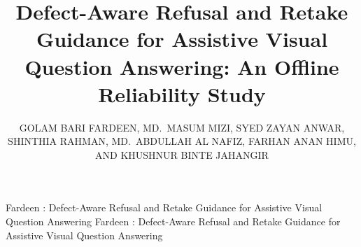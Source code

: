 \documentclass{ieeeaccess}
\begin{document}

\title{Defect-Aware Refusal and Retake Guidance for Assistive Visual Question Answering: An Offline Reliability Study}

\author{\uppercase{Golam Bari Fardeen, Md.\ Masum Mizi, Syed Zayan
Anwar, Shinthia Rahman, Md.\ Abdullah Al Nafiz, Farhan Anan Himu, and Khushnur Binte Jahangir}}

\address{United International University, United City, Madani Ave,
Dhaka 1212, Bangladesh}

\tfootnote{}

\markboth
{Fardeen \headeretal: Defect-Aware Refusal and Retake Guidance for Assistive Visual Question Answering}
{Fardeen \headeretal: Defect-Aware Refusal and Retake Guidance for Assistive Visual Question Answering}
\end{document}
